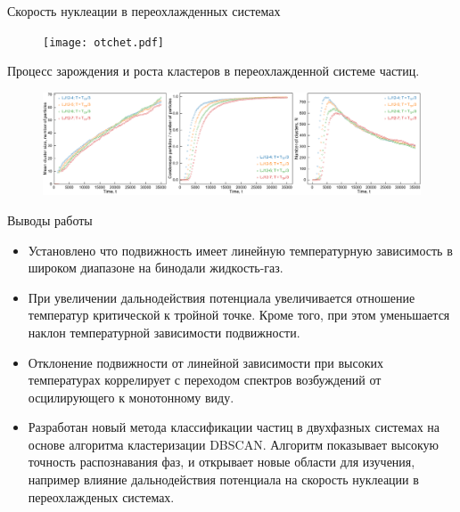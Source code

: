 \documentclass{beamer}
\begin{document}
\begin{frame}{Скорость нуклеации в переохлажденных системах}
\footnotesize{


\begin{figure}[!t]
	 \centering
	 \texttt{[image: otchet.pdf]}
	 \label{otchet}
\end{figure}

Процесс зарождения и роста кластеров в переохлажденной системе частиц.

\begin{figure}[!t]
    \centering
    \includegraphics[width=\linewidth]{nucleation.pdf}
    \label{nucleation}
\end{figure}


}

\end{frame}








\begin{frame}{Выводы работы}
\footnotesize{
\begin{itemize}

    \item Установлено что подвижность имеет линейную температурную зависимость в широком диапазоне на бинодали жидкость-газ.

    \item При увеличении дальнодействия потенциала увеличивается отношение температур критической к тройной точке. Кроме того, при этом уменьшается наклон температурной зависимости подвижности.

    \item Отклонение подвижности от линейной зависимости при высоких температурах коррелирует с переходом спектров возбуждений от осцилирующего к монотонному виду.

    \item Разработан новый метода классификации частиц в двухфазных системах на основе алгоритма кластеризации DBSCAN. Алгоритм показывает высокую точность распознавания фаз, и открывает новые области для изучения, например влияние дальнодействия потенциала на скорость нуклеации в переохлажденых системах.


\end{itemize}


}
\end{frame}
\end{document}
